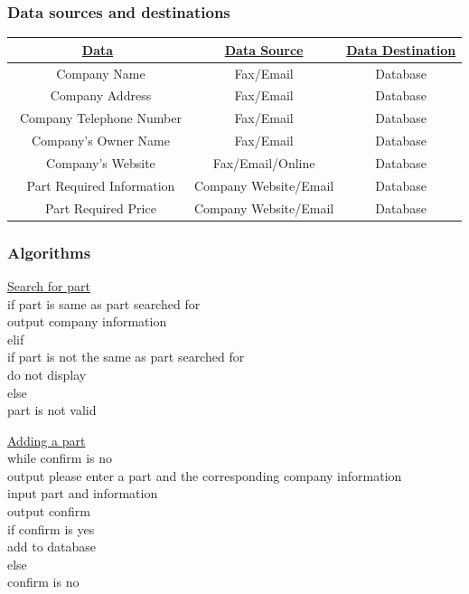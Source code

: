 \subsubsection{Data sources and destinations}
\begin{center}
\begin{tabular}{ |c|c|c| } 
\hline
\bf\underline{Data}                                                                                                      & \bf\underline{Data Source} & \bf\underline{Data Destination}

\\
\hline
\ Company Name & Fax/Email & Database\\
\hline
\ Company Address & Fax/Email & Database\\ 
\hline
\ Company Telephone Number & Fax/Email & Database\\
\hline
\ Company's Owner Name & Fax/Email & Database\\
\hline
\ Company's Website & Fax/Email/Online & Database\\
\hline
\ Part Required Information & Company Website/Email & Database\\
\hline
\ Part Required Price & Company Website/Email & Database\\
\hline
\end{tabular}
\end{center}
\subsubsection{Algorithms}

\underline{Search for part}\\
if part is same as part searched for\\
output company information\\
elif\\
if part is not the same as part searched for\\
do not display\\
else\\
part is not valid

\underline{Adding a part}\\
while confirm is no\\
output please enter a part and the corresponding company information\\
input part and information\\
output confirm\\
if confirm is yes\\
add to database\\
else \\
confirm is no

